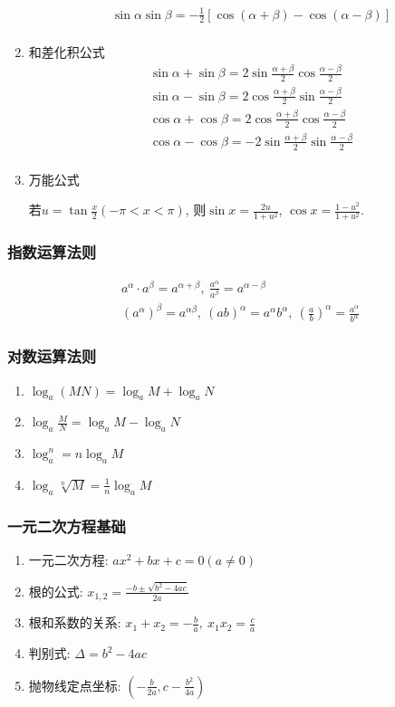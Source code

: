 \begin{enumerate}
\[\begin{split}
& \sin\alpha\sin\beta = -\frac{1}{2}[\cos(\alpha + \beta) - \cos(\alpha - \beta)] \\
\end{split} \]
\item 和差化积公式
\[ \begin{split}
& \sin\alpha + \sin\beta = 2\sin\frac{\alpha+\beta}{2}\cos\frac{\alpha - \beta}{2} \\
& \sin\alpha - \sin\beta = 2\cos\frac{\alpha+\beta}{2}\sin\frac{\alpha - \beta}{2} \\
& \cos\alpha + \cos\beta = 2\cos\frac{\alpha+\beta}{2}\cos\frac{\alpha - \beta}{2} \\
& \cos\alpha - \cos\beta = -2\sin\frac{\alpha+\beta}{2}\sin\frac{\alpha - \beta}{2} \\
\end{split} \]
\item 万能公式\par
若$ u=\tan \frac{x}{2}(-\pi<x<\pi) $, 则$ \sin x=\frac{2u}{1+u^{2}} $, $ \cos x=\frac{1-u^{2}}{1+u^{2}} $.
\end{enumerate}
\subsubsection{指数运算法则}
\vspace*{-2em}
\[ \begin{split}
& a^{\alpha}\cdot a^{\beta}=a^{\alpha + \beta},\  \frac{a^{\alpha}}{a^{\beta}}=a^{\alpha-\beta} \\
& (a^{\alpha})^{\beta}=a^{\alpha \beta},\ (ab)^{\alpha}=a^{\alpha}b^{\alpha},\ (\frac{a}{b})^{\alpha}=\frac{a^{\alpha}}{b^{\alpha}}
\end{split} \]
\subsubsection{对数运算法则}
\begin{enumerate}
\item $ \log_{a}(MN)=\log_{a}M+\log_{a}N  $
\item $ \log_{a}\frac{M}{N}=\log_{a}M-\log_{a}N $
\item $ \log_{a}^{n}=n\log_{a}M $
\item $ \log_{a}\sqrt[n]{M}=\frac{1}{n}\log_{a}M $
\end{enumerate}
\subsubsection{一元二次方程基础}
\begin{enumerate}
\item 一元二次方程: $ ax^{2}+bx+c=0(a\neq 0) $
\item 根的公式: $ x_{1,2}=\frac{-b\pm \sqrt{b^{2}-4ac}}{2a} $
\item 根和系数的关系: $ x_{1}+x_{2}=-\frac{b}{a},\ x_{1}x_{2}=\frac{c}{a} $
\item 判别式: $ \Delta=b^{2}-4ac $
\item 抛物线定点坐标: $ (-\frac{b}{2a},c-\frac{b^{2}}{4a}) $
\end{enumerate}
